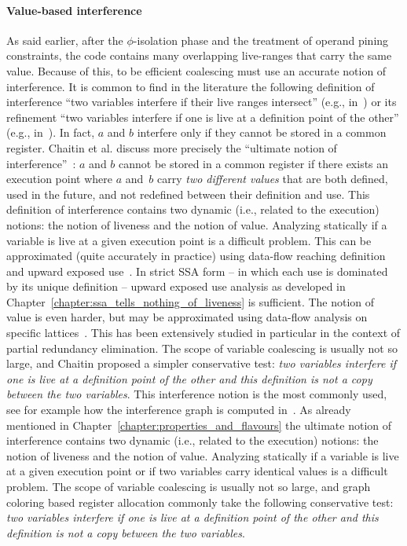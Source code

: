 \paragraph{Value-based interference}
\label{par:alternative_ssa_destruction:value}
As said earlier, after the $\phi$-isolation phase and the treatment of operand pining constraints, the code contains many overlapping live-ranges that carry the same value. Because of this, to be efficient coalescing must use an accurate notion of interference.
\ifhab
It is common to find in the literature the following definition of
  interference ``two variables interfere if their live ranges intersect''
  (e.g.,  in~\cite{George96,liverange.pldi02,SmithRH04}) or its refinement ``two variables interfere if one is live at a definition point of the other'' (e.g., in~\cite{Chaitin82}).  In fact, $a$ and $b$ interfere only if
they cannot be stored in a common register. 
Chaitin et al.  discuss more
  precisely the ``ultimate notion of interference''~\cite{Chaitin81}:
$a$ and $b$
cannot be stored in a common register if there exists an execution point where
$a$ and~$b$ carry {\em two different values} that are both defined, used in the
future, and not redefined between their definition and use.  
%
This definition of interference contains two dynamic (i.e., related to the
execution) notions: the notion of liveness and the notion of value.  
Analyzing statically if a variable is live at a given execution point is a difficult problem. 
This can be approximated (quite accurately in practice) using data-flow reaching definition and upward exposed use~\cite{appel:2002:modern}.  In
strict SSA form -- in which each use is dominated by its unique
definition -- upward exposed use analysis as developed in Chapter~\ref{chapter:ssa_tells_nothing_of_liveness} is sufficient.  The
notion of value is even harder, but may be approximated using data-flow
analysis on specific lattices~\cite{AlpernWZ88, BouchezDEA}.  This has been
extensively studied in particular in the context of partial redundancy
elimination.
The scope of variable coalescing is usually not so large, and
Chaitin proposed a simpler conservative test: \emph{two variables interfere if
  one is live at a definition point of the other and this definition is not a
  copy between the two variables}. This interference notion is the most
commonly used, see for example how the interference graph is computed
in~\cite{appel:2002:modern}.
\else
As already mentioned in Chapter~\ref{chapter:properties_and_flavours} the ultimate notion of interference contains two dynamic (i.e., related to the
execution) notions: the notion of liveness and the notion of value.  
Analyzing statically if a variable is live at a given execution point or if two variables carry identical values is a difficult problem.
The scope of variable coalescing is usually not so large, and graph coloring based register allocation commonly take the following conservative test: \emph{two variables interfere if one is live at a definition point of the other and this definition is not a copy between the two variables}.
\fi

